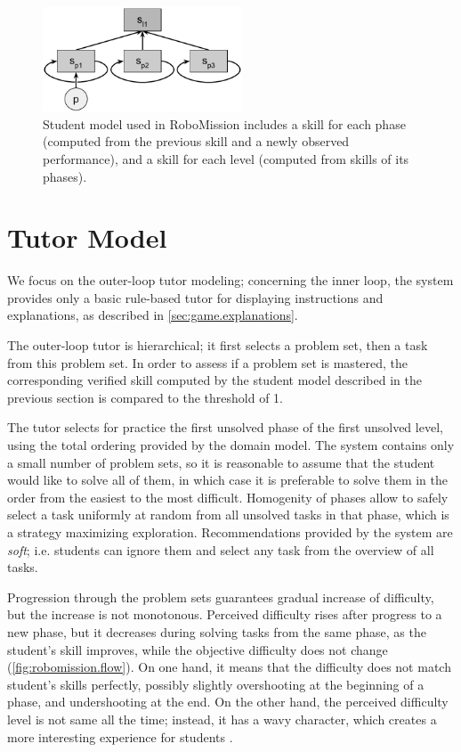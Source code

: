 \begin{figure}[htb]
\centering
\includegraphics[height=31mm]{img/robomission-student-model}
\caption{%
  Student model used in RoboMission includes a skill for each phase
  (computed from the previous skill and a newly observed performance),
  and a skill for each level (computed from skills of its phases).}
\label{fig:robomission.student-model}
\end{figure}

\section{Tutor Model}
\label{robomission.tutor}

We focus on the outer-loop tutor modeling;
concerning the inner loop, the system provides only a basic
rule-based tutor for displaying instructions and explanations,
as described in \cref{sec:game.explanations}.

The outer-loop tutor is hierarchical;
it first selects a problem set, then a task from this problem set.
In order to assess if a problem set is mastered,
the corresponding verified skill
computed by the student model described in the previous section
is compared to the threshold of 1. %

The tutor selects for practice the first unsolved phase of the first
unsolved level, using the total ordering provided by the domain model.
The system contains only a small number of problem sets,
so it is reasonable to assume that the student would like to solve all of
them,
in which case it is preferable to solve them in the order from the
easiest to the most difficult.
Homogenity of phases allow to safely select a task uniformly at random from
all unsolved tasks in that phase, which is a strategy maximizing exploration.
Recommendations provided by the system are \emph{soft};
i.e. students can ignore them and select any task
from the overview of all tasks.

Progression through the problem sets guarantees gradual increase of difficulty,
but the increase is not monotonous.
Perceived difficulty rises after progress to a new phase,
but it decreases during solving tasks from the same phase,
as the student's skill improves, while the objective difficulty does not change
(\cref{fig:robomission.flow}).
On one hand, it means that the difficulty does not match student's
skills perfectly, possibly slightly overshooting at the beginning of a phase,
and undershooting at the end.
On the other hand, the perceived difficulty level is not
same all the time; instead, it has a wavy character, which creates a more
interesting experience for students %
\cite{book-of-lenses}.

